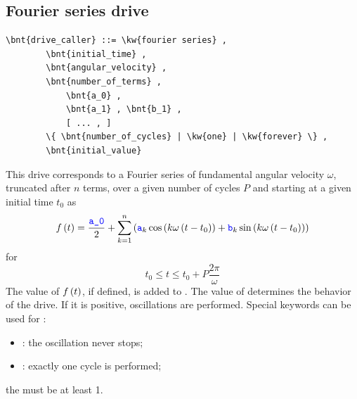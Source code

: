 \subsection{Fourier series drive}
\begin{Verbatim}[commandchars=\\\{\}]
    \bnt{drive_caller} ::= \kw{fourier series} ,
        \bnt{initial_time} ,
        \bnt{angular_velocity} ,
        \bnt{number_of_terms} ,
            \bnt{a_0} ,
            \bnt{a_1} , \bnt{b_1} ,
            [ ... , ]
        \{ \bnt{number_of_cycles} | \kw{one} | \kw{forever} \} , 
        \bnt{initial_value}
\end{Verbatim}
This drive corresponds to a Fourier series of fundamental
angular velocity $\omega$,
truncated after $n$ terms, over a given number of cycles $P$ and starting 
at a given initial time $t_0$ as
\begin{displaymath}
	f\left( t \right) = \frac{\textcolor{blue}{\texttt{a\_0}}}{2} + \sum_{k=1}^n \left( 
		\textcolor{blue}{\texttt{a}}_k \cos\left( k\omega\left( t - t_0 \right) \right)
		+ \textcolor{blue}{\texttt{b}}_k \sin\left( k\omega\left( t - t_0 \right) \right)
	 \right)
\end{displaymath}
for
\begin{displaymath}
	t_0 \le t \le t_0 + P \frac{2 \pi}{\omega}
\end{displaymath}
The value of $f\left( t \right)$, if defined, is added to .
The value of  determines the behavior of the
drive. 
If it is positive,  oscillations are
performed.
Special keywords can be used for :
\begin{itemize}
	\item {}: the oscillation never stops;
	\item {}: exactly one cycle is performed;
\end{itemize}
the  must be at least 1.

